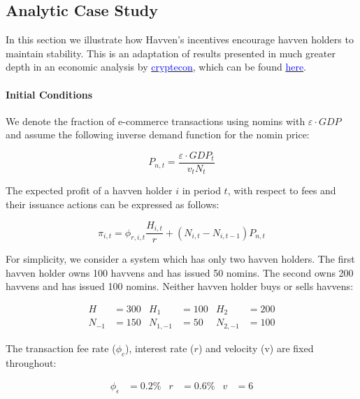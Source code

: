 \newpage

\subsection{Analytic Case Study} In this section we illustrate how Havven's
incentives encourage havven holders to maintain stability. This is an adaptation
of results presented in much greater depth in an economic analysis by \href{http://cryptecon.org/}{\textcolor{blue}{cryptecon}},
which can be found \href{https://havven.io/uploads/havven_cryptecon_report_may_2018.pdf}{\textcolor{blue}{here}}.

\paragraph {Initial Conditions}
\noindent We denote the fraction of e-commerce transactions using nomins with $\varepsilon \cdot GDP$ and
assume the following inverse demand function for the nomin price:

\begin{equation*} \label{eq:nominprice} P_{n,t} = \frac{\varepsilon \cdot GDP_t}{v_tN_t} \end{equation*}

\noindent The expected profit of a havven holder \(i\) in period \(t\), with
respect to fees and their issuance actions can be expressed as follows:

\begin{equation*} 
\pi_{i,t} = \phi_{r,i,t} \frac{H_{i,t}}{r} + (N_{i,t} - N_{i,t-1}) P_{n,t} \label{eq:profit}
\end{equation*}


\noindent For simplicity, we consider a system which
has only two havven holders. The first havven holder owns 100 havvens and has
issued 50 nomins. The second owns 200 havvens and has issued 100 nomins.
Neither havven holder buys or sells havvens:

\begin{align*}
H &= 300 & H_1 &= 100 & H_2 &= 200 \\
N_{-1} &= 150 & N_{1,-1} &= 50 & N_{2,-1} &= 100
\end{align*}

\noindent The transaction fee rate (\(\phi_c\)), interest rate (\(r\)) and
velocity (v) are fixed throughout:

\begin{align*}
\phi_\epsilon &= 0.2\% & r &= 0.6\%  & v &= 6
\end{align*}

